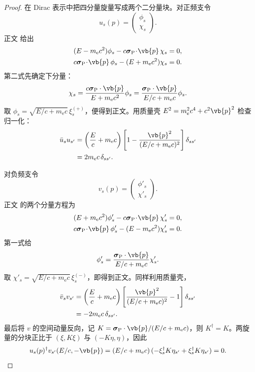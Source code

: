 \begin{proof}
在 Dirac 表示中把四分量旋量写成两个二分量块。对正频支令
\[
u_s(p)=\begin{pmatrix}\phi_s\\ \chi_s\end{pmatrix}.
\]
正文 给出
\begin{align*}
(E-m_{\mathrm e} c^2)\phi_s
-c\boldsymbol\sigma_{\rm P}\!\cdot\!\vb{p}\,\chi_s&=0,\\
c\boldsymbol\sigma_{\rm P}\!\cdot\!\vb{p}\,\phi_s
-(E+m_{\mathrm e} c^2)\chi_s&=0.
\end{align*}
第二式先确定下分量：
\[
\chi_s
=\frac{c\boldsymbol\sigma_{\rm P}\cdot\vb{p}}{E+m_{\mathrm e} c^2}\phi_s
=\frac{\boldsymbol\sigma_{\rm P}\cdot\vb{p}}{E/c+m_{\mathrm e} c}\phi_s.
\]
取
$\phi_s=\sqrt{E/c+m_{\mathrm e} c}\,\xi_s^{(+)}$，便得到正文。用质量壳 $E^2=m_{\mathrm e}^2c^4+c^2\vb{p}^2$ 检查归一化：
\begin{align*}
\bar u_su_{s'}
&=\left(\frac Ec+m_{\mathrm e} c\right)
\left[
1-\frac{\vb{p}^2}{(E/c+m_{\mathrm e} c)^2}
\right]\delta_{ss'}\\
&=2m_{\mathrm e} c\,\delta_{ss'}.
\end{align*}

对负频支令
\[
v_s(p)=\begin{pmatrix}\phi'_s\\ \chi'_s\end{pmatrix}.
\]
正文 的两个分量方程为
\begin{align*}
(E+m_{\mathrm e} c^2)\phi'_s
-c\boldsymbol\sigma_{\rm P}\!\cdot\!\vb{p}\,\chi'_s&=0,\\
c\boldsymbol\sigma_{\rm P}\!\cdot\!\vb{p}\,\phi'_s
-(E-m_{\mathrm e} c^2)\chi'_s&=0.
\end{align*}
第一式给
\[
\phi'_s
=\frac{\boldsymbol\sigma_{\rm P}\cdot\vb{p}}{E/c+m_{\mathrm e} c}\chi'_s.
\]
取
$\chi'_s=\sqrt{E/c+m_{\mathrm e} c}\,\xi_s^{(-)}$，即得到正文。同样利用质量壳，
\begin{align*}
\bar v_sv_{s'}
&=\left(\frac Ec+m_{\mathrm e} c\right)
\left[
\frac{\vb{p}^2}{(E/c+m_{\mathrm e} c)^2}-1
\right]\delta_{ss'}\\
&=-2m_{\mathrm e} c\,\delta_{ss'}.
\end{align*}
最后将 $v$ 的空间动量反向，记 $K=\boldsymbol\sigma_{\rm P}\cdot\vb{p}/(E/c+m_{\mathrm e}c)$，则 $K^\dagger=K$。两旋量的分块正比于 $(\xi,K\xi)$ 与 $(-K\eta,\eta)$，因此
\[
u_s(p)^\dagger v_{s'}(E/c,-\vb{p})
=\left(E/c+m_{\mathrm e}c\right)(-\xi_s^\dagger K\eta_{s'}+\xi_s^\dagger K\eta_{s'})=0.
\]
\end{proof}

